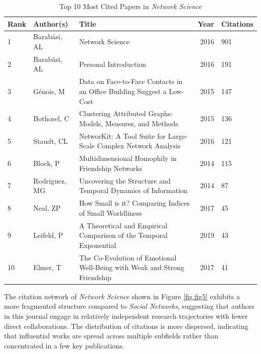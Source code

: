 \documentclass[twocolumn]{article}
\begin{document}
	\begin{table}[htbp]
		\centering
		\scriptsize
		\caption{Top 10 Most Cited Papers in \textit{Network Science}}
		\label{table.tab5}
		\begin{tabularx}{\textwidth}{lXlrl}
			\toprule
			\textbf{Rank} & \textbf{Author(s)} & \textbf{Title} & \textbf{Year} & \textbf{Citations} \\
			\midrule
			1  & Barabási, AL  & Network Science  & 2016  & 901 \\
			2  & Barabási, AL  & Personal Introduction  & 2016  & 191 \\
			3  & Génois, M  & Data on Face-to-Face Contacts in an Office Building Suggest a Low-Cost  & 2015  & 147 \\
			4  & Bothorel, C  & Clustering Attributed Graphs: Models, Measures, and Methods  & 2015  & 136 \\
			5  & Staudt, CL  & NetworKit: A Tool Suite for Large-Scale Complex Network Analysis  & 2016  & 121 \\
			6  & Block, P  & Multidimensional Homophily in Friendship Networks  & 2014  & 115 \\
			7  & Rodriguez, MG  & Uncovering the Structure and Temporal Dynamics of Information  & 2014  & 87 \\
			8  & Neal, ZP  & How Small is it? Comparing Indices of Small Worldliness  & 2017  & 45 \\
			9  & Leifeld, P  & A Theoretical and Empirical Comparison of the Temporal Exponential  & 2019  & 43 \\
			10 & Elmer, T  & The Co-Evolution of Emotional Well-Being with Weak and Strong Friendship  & 2017  & 41 \\
			\bottomrule
		\end{tabularx}
	\end{table}
	
	The citation network of \textit{Network Science} shown in Figure \ref{fig.fig5} exhibits a more fragmented structure compared to \textit{Social Networks}, suggesting that authors in this journal engage in relatively independent research trajectories with fewer direct collaborations. The distribution of citations is more dispersed, indicating that influential works are spread across multiple subfields rather than concentrated in a few key publications.
	
\end{document}
